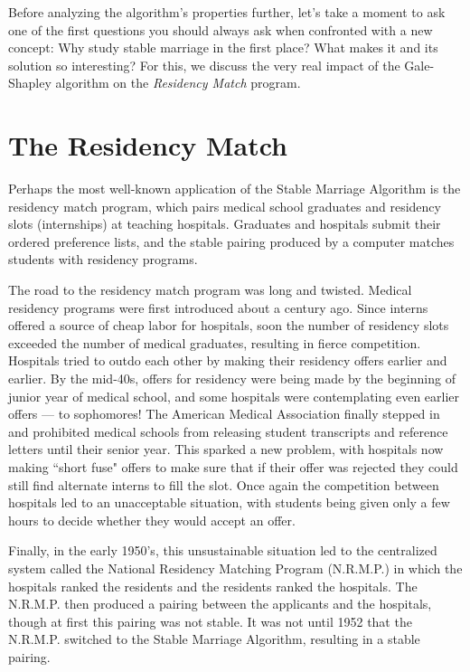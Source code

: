 \documentclass[11pt,fleqn]{article}
\newcounter{thm}
\begin{document}
Before analyzing the algorithm's properties further, let's take a moment to ask one of the first questions you should always ask when confronted with a new concept: Why study stable marriage in the first place? What makes it and its solution so interesting? For this, we discuss the very real impact of the Gale-Shapley algorithm on the \emph{Residency Match} program.

\section{The Residency Match}\label{scn:residency}
Perhaps the most well-known application of the Stable Marriage
Algorithm is the residency match program, which pairs medical school
graduates and residency slots (internships) at teaching hospitals.
Graduates and hospitals submit their ordered preference lists,
and the stable pairing produced by a computer matches students
with residency programs.

The road to the residency match program was long and
twisted. Medical residency programs were first introduced
about a century ago. Since interns offered a source of cheap
labor for hospitals, soon the number of residency slots exceeded
the number of medical graduates, resulting in fierce competition.
Hospitals tried to outdo each other by making their residency
offers earlier and earlier. By the mid-40s, offers for residency
were being made by the beginning of junior year of medical school,
and some hospitals were contemplating even earlier offers ---
to sophomores! The American Medical Association finally stepped
in and prohibited medical schools from releasing student
transcripts and reference letters until their senior year.
This sparked a new problem, with hospitals now making ``short fuse"
offers to make sure that if their offer was rejected they could
still find alternate interns to fill the slot. Once again the
competition between hospitals led to an unacceptable situation,
with students being given only a few hours to decide whether
they would accept an offer.

Finally, in the early 1950's, this unsustainable situation led to the
centralized system called the National Residency Matching Program
(N.R.M.P.) in which the hospitals ranked the
residents and the residents ranked the hospitals. The N.R.M.P. then
produced a pairing between the applicants and the hospitals, though
at first this pairing was not stable.
It was not until 1952 that the N.R.M.P. switched
to the Stable Marriage Algorithm, resulting in a
stable pairing.
\end{document}
